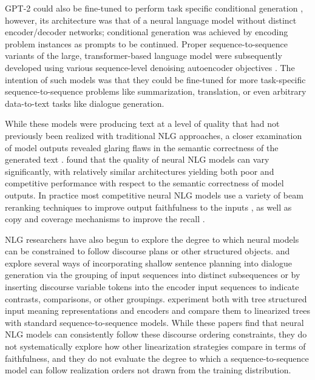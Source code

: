 GPT-2 could also be fine-tuned to perform task specific conditional generation
\citep{ziegler2019,golovanov2019}, however, its architecture was that of a
neural language model without distinct encoder/decoder networks; conditional
generation was achieved by encoding problem instances as prompts to be
continued.  Proper sequence-to-sequence variants of the large,
transformer-based language model were subsequently developed using various
sequence-level denoising autoencoder objectives \citep{zhang2019,raffel2020,
lewis2020}.  The intention of such models was that they could be fine-tuned
for more task-specific sequence-to-sequence problems like summarization,
translation, or even arbitrary data-to-text tasks like dialogue generation.

While these models were producing text at a level of quality that had not
previously been realized with traditional NLG approaches, a closer examination
of model outputs revealed glaring flaws in the semantic correctness of the
generated text \citep{kryscinski2019,kryscinski2020,maynez2020}.
\cite{dusek2020} found that the quality of neural NLG models can vary
significantly, with relatively similar architectures yielding both poor and
competitive performance with respect to the semantic correctness of model
outputs. In practice most competitive neural NLG models use a variety of beam
reranking techniques to improve output faithfulness to the inputs
\citep{dusek2016,juraska2018,wen2015}, as well as copy and coverage mechanisms
to improve the recall \citep{see2017,elder2018}.

NLG researchers have also begun to explore the degree to which neural models
can be constrained to follow discourse plans or other structured objects.
\citet{nayak2017} and \citet{reed2018} explore several ways of incorporating
shallow sentence planning into dialogue generation via the  grouping of input
sequences into distinct subsequences or by inserting discourse variable tokens
into the encoder input sequences to indicate contrasts, comparisons, or other
groupings.  \citet{balakrishnan2019} experiment both with tree structured
input meaning representations  and encoders and compare them to linearized
trees with standard sequence-to-sequence models.  While these papers find that
neural NLG models can consistently follow these discourse ordering
constraints, they do not  systematically explore how other linearization
strategies compare in terms of faithfulness, and they do not evaluate the
degree to which a sequence-to-sequence model can follow realization orders not
drawn from the training distribution.

